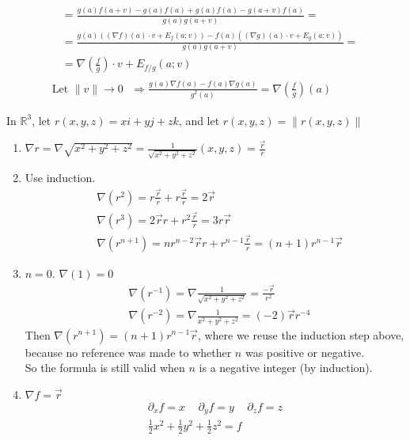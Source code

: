\documentclass[twoside]{amsart}
\theoremstyle{plain}
\theoremstyle{definition}
\newcommand{\exercisehead}[1]
  {
   \noindent{\small\bf Exercise #1.}
   \smallskip}
\begin{document}
\begin{enumerate}
\[\begin{gathered}
\begin{aligned}
  &  = \frac{ g(a) f(a+v) - g(a) f(a) + g(a) f(a) - g(a+v)f(a) }{ g(a)g(a+v) } = \\
  & = \frac{ g(a) ( (\nabla f)(a) \cdot v + E_f(a;v) ) - f(a)( (\nabla g)(a) \cdot v + E_g (a;v) ) }{ g(a) g(a+v) } = \\
  & = \nabla \left( \frac{f}{g} \right) \cdot v + E_{f/g}(a;v) 
\end{aligned} \\
\text{ Let $\| v \| \to 0$  } \Longrightarrow \frac{ g(a) \nabla f(a) - f(a) \nabla g(a) }{ g^2(a) } = \nabla \left( \frac{f}{g} \right)(a) 
\end{gathered}
\]
\end{enumerate}

\exercisehead{8} In $\mathbb{R}^3$, let $r(x,y,z) = xi + yj + zk$, and let $r(x,y,z) = \| r(x,y,z) \|$
\begin{enumerate}
\item $\nabla r = \nabla \sqrt{ x^2 + y^2 + z^2} = \frac{1}{ \sqrt{ x^2 + y^2 + z^2 }} (x,y,z) = \frac{ \vec{r}}{r}$
\item Use induction. \[
\begin{aligned}
  & \nabla (r^2) = r \frac{\vec{r}}{r} + r \frac{\vec{r}}{r} = 2 \vec{r} \\
  & \nabla (r^3) = 2\vec{r} r + r^2 \frac{ \vec{r}}{r} = 3r \vec{r} \\
  &  \nabla (r^{n+1}) = nr^{n-2} \vec{r} r + r^{n-1} \frac{\vec{r}}{r} = (n+1) r^{n-1} \vec{r}
\end{aligned}
\]
\item $n=0$.  $\nabla (1) =0$
\[
\begin{aligned}
  & \nabla (r^{-1}) = \nabla \frac{1}{ \sqrt{ x^2 + y^2 + z^2 } } = \frac{-\vec{r}}{r^2} \\
  & \nabla (r^{-2}) = \nabla \frac{1}{ x^2 + y^2 + z^2 } = (-2) \vec{r} r^{-4} 
\end{aligned}
\]
Then $\nabla (r^{n+1})  = (n+1) r^{n-1} \vec{r}$, where we reuse the induction step above, because no reference was made to whether $n$ was positive or negative.  \\
\phantom{Then} So the formula is still valid when $n$ is a negative integer (by induction).  
\item $\nabla f = \vec{r}$
\[
\begin{gathered}
  \partial_x f = x \quad \, \partial_y f = y \quad \, \partial_z f = z \\
  \boxed{ \frac{1}{2} x^2 + \frac{1}{2} y^2 + \frac{1}{2} z^2 =  f }
\end{gathered}
\]
\end{enumerate}
\end{document}
